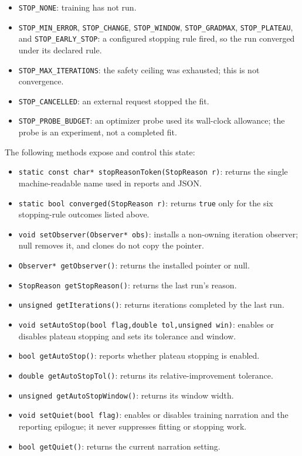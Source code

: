 \begin{itemize}
\item \texttt{STOP\_NONE}: training has not run.
\item \texttt{STOP\_MIN\_ERROR}, \texttt{STOP\_CHANGE},
      \texttt{STOP\_WINDOW}, \texttt{STOP\_GRADMAX},
      \texttt{STOP\_PLATEAU}, and \texttt{STOP\_EARLY\_STOP}: a configured
      stopping rule fired, so the run converged under its declared rule.
\item \texttt{STOP\_MAX\_ITERATIONS}: the safety ceiling was exhausted; this is
      not convergence.
\item \texttt{STOP\_CANCELLED}: an external request stopped the fit.
\item \texttt{STOP\_PROBE\_BUDGET}: an optimizer probe used its wall-clock
      allowance; the probe is an experiment, not a completed fit.
\end{itemize}

The following methods expose and control this state:

\begin{itemize}
\item \texttt{static const char* stopReasonToken(StopReason r)}: returns the
      single machine-readable name used in reports and JSON.
\item \texttt{static bool converged(StopReason r)}: returns \texttt{true} only
      for the six stopping-rule outcomes listed above.
\item \texttt{void setObserver(Observer* obs)}: installs a non-owning iteration
      observer; null removes it, and clones do not copy the pointer.
\item \texttt{Observer* getObserver()}: returns the installed pointer or null.
\item \texttt{StopReason getStopReason()}: returns the last run's reason.
\item \texttt{unsigned getIterations()}: returns iterations completed by the
      last run.
\item \texttt{void setAutoStop(bool flag,double tol,unsigned win)}: enables or
      disables plateau stopping and sets its tolerance and window.
\item \texttt{bool getAutoStop()}: reports whether plateau stopping is enabled.
\item \texttt{double getAutoStopTol()}: returns its relative-improvement tolerance.
\item \texttt{unsigned getAutoStopWindow()}: returns its window width.
\item \texttt{void setQuiet(bool flag)}: enables or disables training narration
      and the reporting epilogue; it never suppresses fitting or stopping work.
\item \texttt{bool getQuiet()}: returns the current narration setting.
\end{itemize}

